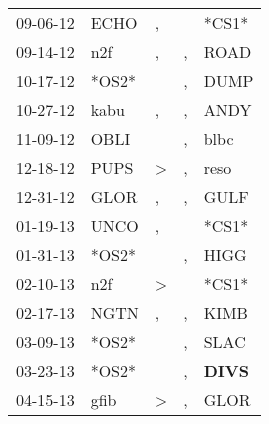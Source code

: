 \begin{supertabular}{p{0.07\textwidth}p{0.06\textwidth}p{0.02\textwidth}p{0.02\textwidth}p{0.06\textwidth}}
          09-06-12\textsuperscript{} &           ECHO\textsuperscript{} &                , &                  &                            *CS1* \\
          09-14-12\textsuperscript{} &            n2f\textsuperscript{} &                , &                , &           ROAD\textsuperscript{} \\
          10-17-12\textsuperscript{} &                            *OS2* &                  &                , &           DUMP\textsuperscript{} \\
          10-27-12\textsuperscript{} &           kabu\textsuperscript{} &                , &                , &           ANDY\textsuperscript{} \\
          11-09-12\textsuperscript{} &           OBLI\textsuperscript{} &                  &                , &           blbc\textsuperscript{} \\
          12-18-12\textsuperscript{} &           PUPS\textsuperscript{} &     \textgreater &                , &           reso\textsuperscript{} \\
          12-31-12\textsuperscript{} &           GLOR\textsuperscript{} &                , &                , &           GULF\textsuperscript{} \\
          01-19-13\textsuperscript{} &           UNCO\textsuperscript{} &                , &                  &                            *CS1* \\
          01-31-13\textsuperscript{} &                            *OS2* &                  &                , &           HIGG\textsuperscript{} \\
          02-10-13\textsuperscript{} &            n2f\textsuperscript{} &     \textgreater &                  &                            *CS1* \\
          02-17-13\textsuperscript{} &           NGTN\textsuperscript{} &                , &                , &           KIMB\textsuperscript{} \\
          03-09-13\textsuperscript{} &                            *OS2* &                  &                , &           SLAC\textsuperscript{} \\
          03-23-13\textsuperscript{} &                            *OS2* &                  &                , &  \textbf{DIVS\textsuperscript{}} \\
          04-15-13\textsuperscript{} &           gfib\textsuperscript{} &     \textgreater &                , &           GLOR\textsuperscript{} \\

\end{supertabular}
